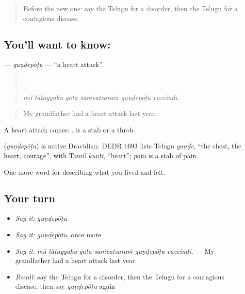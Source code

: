 \label{lesson:TE-C513-gundepotu}



\begin{quote}
Before the new one: say the Telugu for a disorder, then the Telugu for a contagious disease.
\end{quote}

\subsection*{You'll want to know: }
\textbf{} — \emph{guṇḍepōṭu} — \textquotedblleft{}a heart attack\textquotedblright{}.

\begin{quote}
     .
\end{quote}

\begin{quote}
\emph{mā tātayyaku gata saṁvatsaraṁ guṇḍepōṭu vaccindi.}
\end{quote}

\begin{quote}
My grandfather had a heart attack last year.
\end{quote}

A heart attack comes:  .  is a stab or a throb.

\begin{cousinweb}
\textbf{} (\emph{guṇḍepōṭu}) is native Dravidian: DEDR 1693 lists Telugu \emph{guṇḍe}, \textquotedblleft{}the chest, the heart, courage\textquotedblright{}, with Tamil \emph{kuṇṭi}, \textquotedblleft{}heart\textquotedblright{}; \emph{pōṭu} is a stab of pain.
\end{cousinweb}

\begin{grammarlens}[title={What you've built}]
One more word for describing what you lived and felt.
\end{grammarlens}

\subsection*{Your turn}
\begin{itemize}
\raggedright
  \item \emph{Say it:} \emph{guṇḍepōṭu}
  \item \emph{Say it:} \emph{guṇḍepōṭu}, once more
  \item \emph{Say it:} \emph{mā tātayyaku gata saṁvatsaraṁ guṇḍepōṭu vaccindi.} — My grandfather had a heart attack last year.
  \item \emph{Recall:} say the Telugu for a disorder, then the Telugu for a contagious disease, then say \emph{guṇḍepōṭu} again
\end{itemize}

